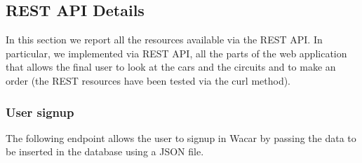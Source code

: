 \subsection{REST API Details}

In this section we report all the resources available via the REST API. In particular, we implemented via REST API, all the parts of the web application that allows the final user to look at the cars and the circuits and to make an order (the REST resources have been tested via the curl method).

\subsubsection*{User signup}

The following endpoint allows the user to signup in Wacar by passing the data to be inserted in the database using a JSON file.

